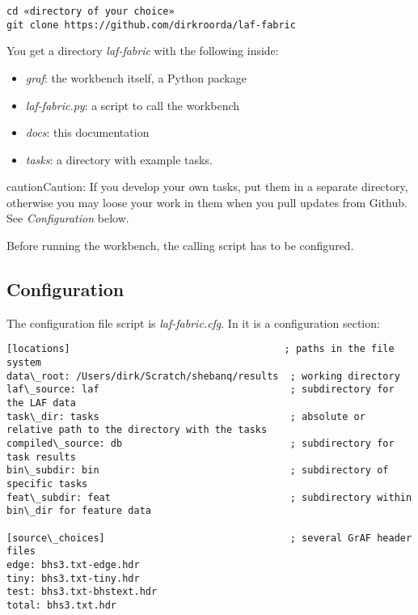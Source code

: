 \documentclass[letterpaper,10pt,english]{sphinxmanual}
\begin{document}
\begin{Verbatim}[commandchars=\\\{\}]
cd «directory of your choice»
git clone https://github.com/dirkroorda/laf-fabric
\end{Verbatim}

You get a directory \emph{laf-fabric} with the following inside:
\begin{itemize}
\item {} 
\emph{graf}: the workbench itself, a Python package

\item {} 
\emph{laf-fabric.py}: a script to call the workbench

\item {} 
\emph{docs}: this documentation

\item {} 
\emph{tasks}: a directory with example tasks.

\end{itemize}

\begin{notice}{caution}{Caution:}
If you develop your own tasks, put them in a separate directory, otherwise you
may loose your work in them when you pull updates from Github.
See \emph{Configuration} below.
\end{notice}

Before running the workbench, the calling script has to be configured.


\subsection{Configuration}
\label{workbench:configuration}
The configuration file script is \emph{laf-fabric.cfg}.
In it is a configuration section:

\begin{Verbatim}[commandchars=\\\{\}]
[locations]                                     ; paths in the file system
data\_root: /Users/dirk/Scratch/shebanq/results  ; working directory
laf\_source: laf                                 ; subdirectory for the LAF data
task\_dir: tasks                                 ; absolute or relative path to the directory with the tasks
compiled\_source: db                             ; subdirectory for task results
bin\_subdir: bin                                 ; subdirectory of specific tasks
feat\_subdir: feat                               ; subdirectory within bin\_dir for feature data

[source\_choices]                                ; several GrAF header files
edge: bhs3.txt-edge.hdr
tiny: bhs3.txt-tiny.hdr
test: bhs3.txt-bhstext.hdr
total: bhs3.txt.hdr
\end{Verbatim}
\end{document}
